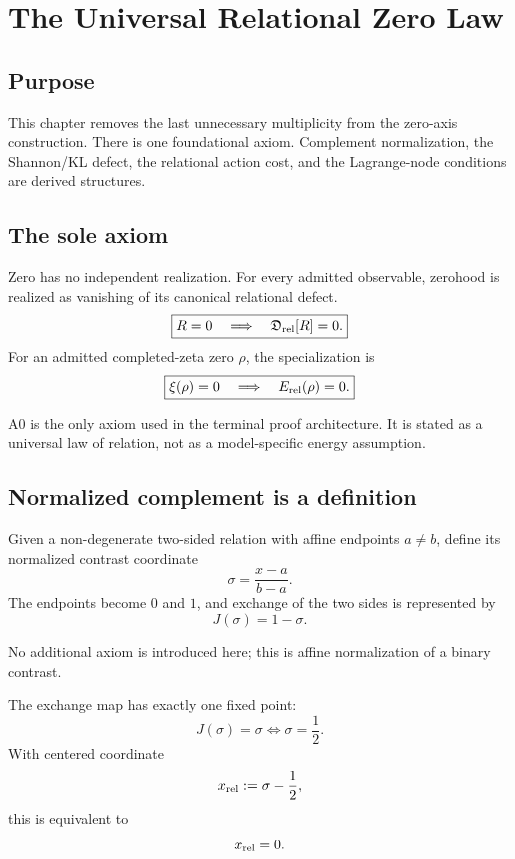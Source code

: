 \chapter{The Universal Relational Zero Law}
\label{chap:relational-zero-triad}

\section{Purpose}

This chapter removes the last unnecessary multiplicity from the zero-axis
construction.  There is one foundational axiom.  Complement normalization,
the Shannon/KL defect, the relational action cost, and the Lagrange-node
conditions are derived structures.

\section{The sole axiom}

\begin{axiom}
\label{ax:rz-zero}
Zero has no independent realization.  For every admitted observable, zerohood
is realized as vanishing of its canonical relational defect.
\[
\boxed{
R=0
\quad\Longrightarrow\quad
\mathfrak D_{\rm rel}[R]=0.
}
\]
For an admitted completed-zeta zero \(\rho\), the specialization is
\[
\boxed{
\xi(\rho)=0
\quad\Longrightarrow\quad
E_{\rm rel}(\rho)=0.
}
\]
\end{axiom}

A0 is the only axiom used in the terminal proof architecture.  It is stated as
a universal law of relation, not as a model-specific energy assumption.

\section{Normalized complement is a definition}

Given a non-degenerate two-sided relation with affine endpoints \(a\ne b\),
define its normalized contrast coordinate
\[
\sigma=\frac{x-a}{b-a}.
\]
The endpoints become \(0\) and \(1\), and exchange of the two sides is
represented by
\[
J(\sigma)=1-\sigma.
\]

No additional axiom is introduced here; this is affine normalization of a
binary contrast.

\begin{theorem}
\label{thm:rz-fixed-point}
The exchange map has exactly one fixed point:
\[
J(\sigma)=\sigma
\iff
\sigma=\frac12.
\]
With centered coordinate
\[
x_{\rm rel}:=\sigma-\frac12,
\]
this is equivalent to
\[
x_{\rm rel}=0.
\]
\end{theorem}

